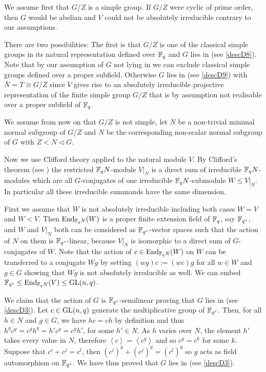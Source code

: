 We assume first that $G/Z$ is a simple group. If $G/Z$ were cyclic of prime 
order, then $G$ would be abelian and $V$ could not be absolutely
irreducible contrary to our assumptions.

There are two possibilities:
The first is that $G/Z$ is one of the
classical simple groups in its natural representation defined over $\mathbb{F}_q$
and $G$ lies in  (see
\ref{descD8}). Note that by our assumption of $G$ not lying in  we can
exclude classical simple groups defined over a proper subfield. Otherwise
$G$ lies in  (see \ref{descD9}) with
$\bar N =T \cong G/Z$ since $V$ gives rise to an absolutely irreducible
projective representation of the finite simple group $G/Z$ that
is by assumption not realisable over a proper subfield of $\mathbb{F}_q$.

We assume from now on that $G/Z$ is not simple, let $\bar N$
be a non-trivial minimal normal subgroup of $G/Z$ and $N$ be
the corresponding non-scalar normal subgroup of $G$ with $Z < N
\triangleleft G$.

Now we use Clifford theory applied to the natural module $V$. By Clifford's
theorem (see \cite[(49.2) and (49.7)]{CR0}) the restricted $\mathbb{F}_q N$-module
$V|_N$ is a direct sum of irreducible $\mathbb{F}_q N$-modules which are all
$G$-conjugates of one irreducible $\mathbb{F}_q N$-submodule $W \le V|_N$. In
particular all these irreducible summands have the same dimension. 

First we assume that $W$ is not absolutely irreducible including both
cases $W = V$ and $W < V$. Then $\End_{\F_q N}(W)$ is a proper finite
extension field of $\mathbb{F}_q$, say $\mathbb{F}_{q^s}$, and $W$ and $V|_N$
both can be considered as $\mathbb{F}_{q^s}$-vector spaces such that the action of
$N$ on them is $\mathbb{F}_{q^s}$-linear, because $V|_N$ is isomorphic to a direct
sum of $G$-conjugates of $W$. Note that the action of $c \in \End_{\F_q
N}(W)$ on $W$ can be transferred to a conjugate $Wg$ by setting
$(wg)c := (wc)g$ for all $w \in W$ and $g \in G$ showing that $Wg$ is
not absolutely irreducible as well.  
We can embed $\F_{q^s} \le \End_{\F_q N}(V) \le \GL(n,q)$.

We claim that the action of $G$ is $\mathbb{F}_{q^s}$-semilinear proving that $G$ lies
in  (see \ref{descD3}). Let $c \in \GL(n,q)$ generate the
multiplicative group of $\mathbb{F}_{q^s}$. Then, for all $h \in N$ and $g
\in G$, we have $hc=ch$ by definition and thus $h^g c^g = c^g h^g =
h' c^g = c^g h'$, for some $h' \in N$. As $h$ varies over $N$, the
element $h'$ takes every value in $N$, therefore $\left< c \right>
= \left< c^g \right>$ and so $c^g = c^k$ for some $k$. Suppose that
$c^i + c^j = c^l$, then $(c^i)^g + (c^j)^g = (c^l)^g$ so $g$ acts as
field automorphism on $\mathbb{F}_{q^s}$. We have thus proved that $G$ 
lies in  (see \ref{descD3}).


